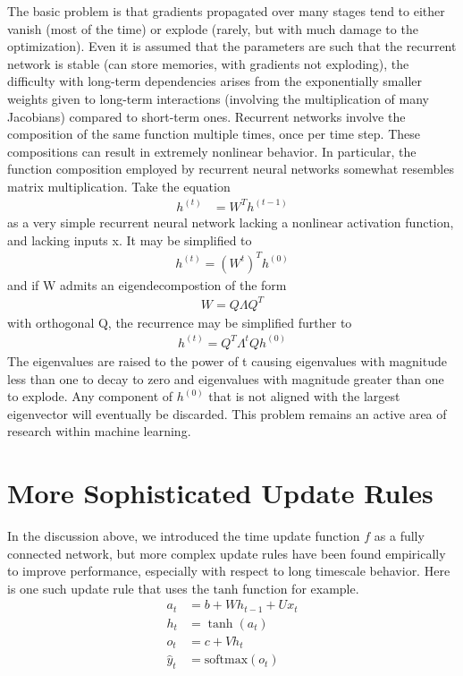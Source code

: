 \documentclass[book.tex]{subfiles}
\begin{document}
The basic problem is that gradients propagated over many stages tend to either vanish (most of the time) or explode (rarely, but with much damage to the optimization). Even it is assumed that the parameters are such that the recurrent network is stable (can store memories, with gradients not exploding), the difficulty with long-term dependencies arises from the exponentially smaller weights given to long-term interactions (involving the multiplication of many Jacobians) compared to short-term ones. Recurrent networks involve the composition of the same function multiple times, once per time step. These compositions can result in extremely nonlinear behavior. In particular, the function composition employed by recurrent neural networks somewhat resembles matrix multiplication. Take the equation
\begin{align}
h^{(t)} &= W^Th^{(t-1)}
\end{align}
as a very simple recurrent neural network lacking a nonlinear activation function, and lacking inputs x. It may be simplified to 
\begin{align}
    h^{(t)} = (W^t)^Th^{(0)}
\end{align}
and if W admits an eigendecompostion of the form
\begin{align}
    W=Q\Lambda Q^T
\end{align}
with orthogonal Q, the recurrence may be simplified further to
\begin{align}
    h^{(t)}=Q^T\Lambda^tQh^{(0)}
\end{align}
The eigenvalues are raised to the power of t causing eigenvalues with magnitude less than one to decay to zero and eigenvalues with magnitude greater than one to explode. Any component of $h^{(0)}$ that is not aligned with the largest eigenvector will eventually be discarded. This problem remains an active area of research within machine learning. 

\section{More Sophisticated Update Rules}

In the discussion above, we introduced the time update function $f$ as a fully connected network, but more complex update rules have been found empirically to improve performance, especially with respect to long timescale behavior. Here is one such update rule that uses the $\mathrm{tanh}$ function for example. 
\begin{align}
    a_t &= b + W h_{t-1} + U x_{t} \\
    h_t &= \tanh(a_t) \\
    o_t &= c + V h_{t} \\
    \hat{y}_t &= \textrm{softmax}(o_t)
\end{align}
\end{document}
